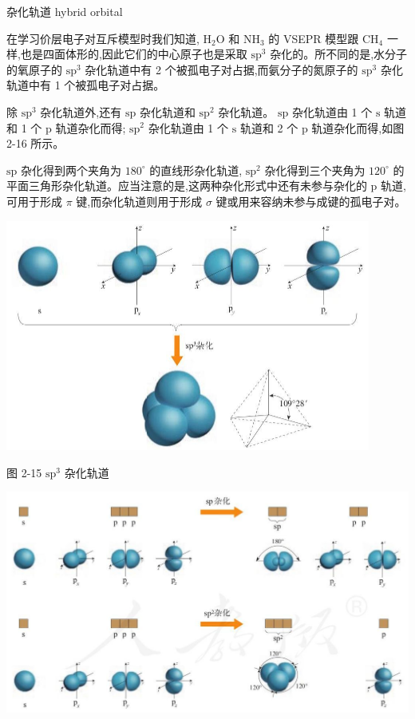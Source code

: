\documentclass[10pt]{article}
\begin{document}
\begin{mdframed}

杂化轨道 hybrid orbital

\end{mdframed}

在学习价层电子对互斥模型时我们知道, \({\mathrm{H}}_{2}\mathrm{O}\) 和 \({\mathrm{{NH}}}_{3}\) 的 VSEPR 模型跟 \({\mathrm{{CH}}}_{4}\) 一样,也是四面体形的,因此它们的中心原子也是采取 \({\mathrm{{sp}}}^{3}\) 杂化的。所不同的是,水分子的氧原子的 \({\mathrm{{sp}}}^{3}\) 杂化轨道中有 2 个被孤电子对占据,而氨分子的氮原子的 \({\mathrm{{sp}}}^{3}\) 杂化轨道中有 1 个被孤电子对占据。

除 \({\mathrm{{sp}}}^{3}\) 杂化轨道外,还有 \(\mathrm{{sp}}\) 杂化轨道和 \({\mathrm{{sp}}}^{2}\) 杂化轨道。 \(\mathrm{{sp}}\) 杂化轨道由 1 个 \(\mathrm{s}\) 轨道和 1 个 \(\mathrm{p}\) 轨道杂化而得; \({\mathrm{{sp}}}^{2}\) 杂化轨道由 1 个 \(\mathrm{s}\) 轨道和 2 个 \(\mathrm{p}\) 轨道杂化而得,如图 2-16 所示。

\(\mathrm{{sp}}\) 杂化得到两个夹角为 \({180}^{ \circ }\) 的直线形杂化轨道, \({\mathrm{{sp}}}^{2}\) 杂化得到三个夹角为 \({120}^{ \circ }\) 的平面三角形杂化轨道。应当注意的是,这两种杂化形式中还有未参与杂化的 \(\mathrm{p}\) 轨道,可用于形成 \(\pi\) 键,而杂化轨道则用于形成 \(\sigma\) 键或用来容纳未参与成键的孤电子对。

\begin{center}
\includegraphics[max width=0.9\textwidth]{images/0190e026-5a11-7df7-bd27-54d09026ba7a_51_175399.jpg}
\end{center}

图 2-15 \({\mathrm{{sp}}}^{3}\) 杂化轨道

\begin{center}
\includegraphics[max width=1.0\textwidth]{images/0190e026-5a11-7df7-bd27-54d09026ba7a_51_201775.jpg}
\end{center}
\end{document}
